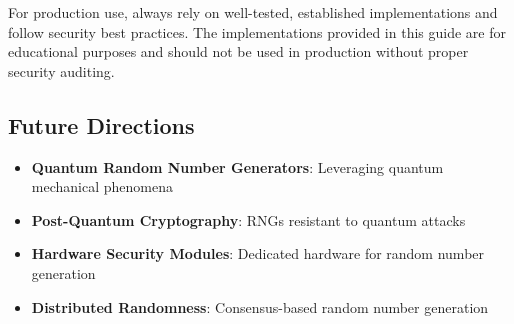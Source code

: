 \documentclass[11pt,a4paper]{article}
\begin{document}
For production use, always rely on well-tested, established implementations and follow security best practices. The implementations provided in this guide are for educational purposes and should not be used in production without proper security auditing.

\subsection{Future Directions}

\begin{itemize}
    \item \textbf{Quantum Random Number Generators}: Leveraging quantum mechanical phenomena
    \item \textbf{Post-Quantum Cryptography}: RNGs resistant to quantum attacks
    \item \textbf{Hardware Security Modules}: Dedicated hardware for random number generation
    \item \textbf{Distributed Randomness}: Consensus-based random number generation
\end{itemize}
\end{document}
